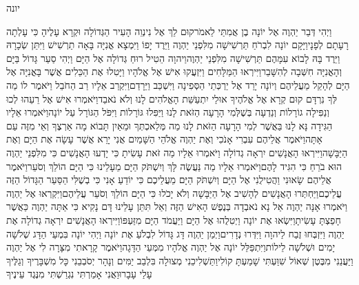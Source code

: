 \documentclass[../main/main.tex]{subfiles}
\begin{document}
\thispagestyle{empty}
\Incipit{}יונה
\cleardoublepage
\RTLmulticolcolumns
\begin{multicols*}{\ncols}
וַיְהִי דְּבַר יַהְוֶה אֶל יוֹנָה בֶן אֲמִתַּי לֵאמֹר\PreVerseSpace{}קוּם לֵךְ אֶל נִינְוֵה הָעִיר הַגְּדוֹלָה וּקְרָא עָלֶיהָ כִּי עָלְתָה רָעָתָם לְפָנָי\PreVerseSpace{}וַיָּקָם יוֹנָה לִבְרֹחַ תַּרְשִׁישָׁה מִלִּפְנֵי יַהְוֶה וַיֵּרֶד יָפוֹ וַיִּמְצָא אֳנִיָּה בָּאָה תַרְשִׁישׁ וַיִּתֵּן שְׂכָרָהּ וַיֵּרֶד בָּהּ לָבוֹא עִמָּהֶם תַּרְשִׁישָׁה מִלִּפְנֵי יַהְוֶה\PreVerseSpace{}וַיהוָה הֵטִיל רוּחַ גְּדוֹלָה אֶל הַיָּם וַיְהִי סַעַר גָּדוֹל בַּיָּם וְהָאֳנִיָּה חִשְּׁבָה לְהִשָּׁבֵר\PreVerseSpace{}וַיִּירְאוּ הַמַּלָּחִים וַיִּזְעֲקוּ אִישׁ אֶל אֱלֹהָיו וַיָּטִלוּ אֶת הַכֵּלִים אֲשֶׁר בָּאֳנִיָּה אֶל הַיָּם לְהָקֵל מֵעֲלֵיהֶם וְיוֹנָה יָרַד אֶל יַרְכְּתֵי הַסְּפִינָה וַיִּשְׁכַּב וַיֵּרָדַם\PreVerseSpace{}וַיִּקְרַב אֵלָיו רַב הַחֹבֵל וַיֹּאמֶר לוֹ מַה לְּךָ נִרְדָּם קוּם קְרָא אֶל אֱלֹהֶיךָ אוּלַי יִתְעַשֵּׁת הָאֱלֹהִים לָנוּ וְלֹא נֹאבֵד\PreVerseSpace{}וַיֹּאמְרוּ אִישׁ אֶל רֵעֵהוּ לְכוּ וְנַפִּילָה גוֹרָלוֹת וְנֵדְעָה בְּשֶׁלְּמִי הָרָעָה הַזֹּאת לָנוּ וַיַּפִּלוּ גּוֹרָלוֹת וַיִּפֹּל הַגּוֹרָל עַל יוֹנָה\PreVerseSpace{}וַיֹּאמְרוּ אֵלָיו הַגִּידָה נָּא לָנוּ בַּאֲשֶׁר לְמִי הָרָעָה הַזֹּאת לָנוּ מַה מְּלַאכְתְּךָ וּמֵאַיִן תָּבוֹא מָה אַרְצֶךָ וְאֵי מִזֶּה עַם אָתָּה\PreVerseSpace{}וַיֹּאמֶר אֲלֵיהֶם עִבְרִי אָנֹכִי וְאֶת יַהְוֶה אֱלֹהֵי הַשָּׁמַיִם אֲנִי יָרֵא אֲשֶׁר עָשָׂה אֶת הַיָּם וְאֶת הַיַּבָּשָׁה\PreVerseSpace{}וַיִּירְאוּ הָאֲנָשִׁים יִרְאָה גְדוֹלָה וַיֹּאמְרוּ אֵלָיו מַה זֹּאת עָשִׂיתָ כִּי יָדְעוּ הָאֲנָשִׁים כִּי מִלִּפְנֵי יַהְוֶה הוּא בֹרֵחַ כִּי הִגִּיד לָהֶם\PreVerseSpace{}וַיֹּאמְרוּ אֵלָיו מַה נַּעֲשֶׂה לָּךְ וְיִשְׁתֹּק הַיָּם מֵעָלֵינוּ כִּי הַיָּם הוֹלֵךְ וְסֹעֵר\PreVerseSpace{}וַיֹּאמֶר אֲלֵיהֶם שָׂאוּנִי וַהֲטִילֻנִי אֶל הַיָּם וְיִשְׁתֹּק הַיָּם מֵעֲלֵיכֶם כִּי יוֹדֵעַ אָנִי כִּי בְשֶׁלִּי הַסַּעַר הַגָּדוֹל הַזֶּה עֲלֵיכֶם\PreVerseSpace{}וַיַּחְתְּרוּ הָאֲנָשִׁים לְהָשִׁיב אֶל הַיַּבָּשָׁה וְלֹא יָכֹלוּ כִּי הַיָּם הוֹלֵךְ וְסֹעֵר עֲלֵיהֶם\PreVerseSpace{}וַיִּקְרְאוּ אֶל יַהְוֶה וַיֹּאמְרוּ אָנָּה יַהְוֶה אַל נָא נֹאבְדָה בְּנֶפֶשׁ הָאִישׁ הַזֶּה וְאַל תִּתֵּן עָלֵינוּ דָּם נָקִיא כִּי אַתָּה יַהְוֶה כַּאֲשֶׁר חָפַצְתָּ עָשִׂיתָ\PreVerseSpace{}וַיִּשְׂאוּ אֶת יוֹנָה וַיְטִלֻהוּ אֶל הַיָּם וַיַּעֲמֹד הַיָּם מִזַּעְפּוֹ\PreVerseSpace{}וַיִּירְאוּ הָאֲנָשִׁים יִרְאָה גְדוֹלָה אֶת יַהְוֶה וַיִּזְבְּחוּ זֶבַח לַיהוָה וַיִּדְּרוּ נְדָרִים\PreChapterSpace{}וַיְמַן יַהְוֶה דָּג גָּדוֹל לִבְלֹעַ אֶת יוֹנָה וַיְהִי יוֹנָה בִּמְעֵי הַדָּג שְׁלֹשָׁה יָמִים וּשְׁלֹשָׁה לֵילוֹת\PreVerseSpace{}וַיִּתְפַּלֵּל יוֹנָה אֶל יַהְוֶה אֱלֹהָיו מִמְּעֵי הַדָּגָה\PreVerseSpace{}וַיֹּאמֶר קָרָאתִי מִצָּרָה לִי אֶל יַהְוֶה וַיַּעֲנֵנִי מִבֶּטֶן שְׁאוֹל שִׁוַּעְתִּי שָׁמַעְתָּ קוֹלִי\PreVerseSpace{}וַתַּשְׁלִיכֵנִי מְצוּלָה בִּלְבַב יַמִּים וְנָהָר יְסֹבְבֵנִי כָּל מִשְׁבָּרֶיךָ וְגַלֶּיךָ עָלַי עָבָרוּ\PreVerseSpace{}וַאֲנִי אָמַרְתִּי נִגְרַשְׁתִּי מִנֶּגֶד עֵינֶיךָ 
\end{multicols*}
\end{document}
